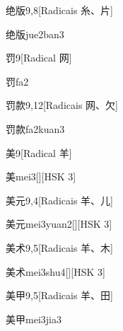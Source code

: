 \begin{entry}{绝版}{9,8}[Radicais ⽷、⽚]
  \begin{phonetics}{绝版}{jue2ban3}
  \end{phonetics}
\end{entry}

\begin{entry}{罚}{9}[Radical ⽹]
  \begin{phonetics}{罚}{fa2}
  \end{phonetics}
\end{entry}

\begin{entry}{罚款}{9,12}[Radicais ⽹、⽋]
  \begin{phonetics}{罚款}{fa2kuan3}
  \end{phonetics}
\end{entry}

\begin{entry}{美}{9}[Radical ⽺]
  \begin{phonetics}{美}{mei3}[][HSK 3]
  \end{phonetics}
\end{entry}

\begin{entry}{美元}{9,4}[Radicais ⽺、⼉]
  \begin{phonetics}{美元}{mei3yuan2}[][HSK 3]
  \end{phonetics}
\end{entry}

\begin{entry}{美术}{9,5}[Radicais ⽺、⽊]
  \begin{phonetics}{美术}{mei3shu4}[][HSK 3]
  \end{phonetics}
\end{entry}

\begin{entry}{美甲}{9,5}[Radicais ⽺、⽥]
  \begin{phonetics}{美甲}{mei3jia3}
  \end{phonetics}
\end{entry}

